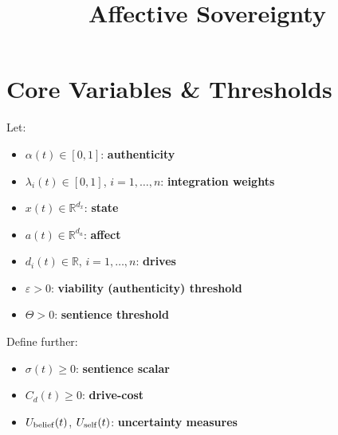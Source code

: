 \documentclass{article}
\title{Affective Sovereignty}
\date{}
\begin{document}
\maketitle

\section{Core Variables \& Thresholds}
Let:
\begin{itemize}
  \item $\alpha(t)\in[0,1]$: \textbf{authenticity}
  \item $\lambda_{i}(t)\in[0,1]$, $i=1,\dots,n$: \textbf{integration weights}
  \item $x(t)\in\mathbb{R}^{d_x}$: \textbf{state}
  \item $a(t)\in\mathbb{R}^{d_a}$: \textbf{affect}
  \item $d_{i}(t)\in\mathbb{R}$, $i=1,\dots,n$: \textbf{drives}
  \item $\varepsilon>0$: \textbf{viability (authenticity) threshold}
  \item $\Theta>0$: \textbf{sentience threshold}
\end{itemize}
Define further:
\begin{itemize}
  \item $\sigma(t)\ge0$: \textbf{sentience scalar}
  \item $C_d(t)\ge0$: \textbf{drive-cost}
  \item $U_{\rm belief}(t)$, $U_{\rm self}(t)$: \textbf{uncertainty measures}
\end{itemize}

\end{document}
